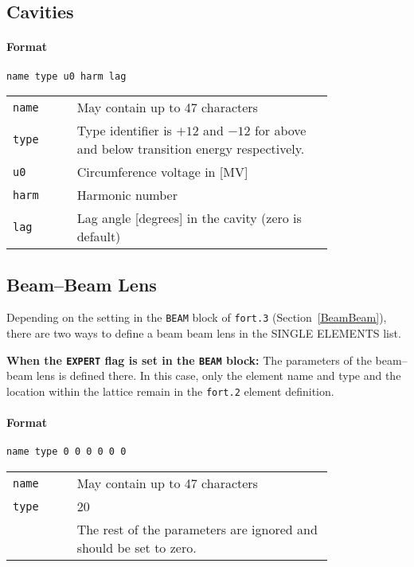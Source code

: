 \subsection{Cavities} \label{Cavities}

\paragraph{Format} \texttt{name type u0 harm lag}

\bigskip
\begin{tabular}{@{}lp{0.8\linewidth}}
    \texttt{name} & May contain up to 47 characters \\
    \texttt{type} & Type identifier is $+12$ and $-12$ for above and below transition energy respectively. \\
    \texttt{u0}   & Circumference voltage in [MV] \\
    \texttt{harm} & Harmonic number \\
    \texttt{lag}  & Lag angle [degrees] in the cavity (zero is default)
\end{tabular}

\subsection{Beam--Beam Lens} \label{BBS}

Depending on the setting in the \texttt{BEAM} block of \texttt{fort.3} (Section~\ref{BeamBeam}), there are two ways to define a beam beam lens in the SINGLE ELEMENTS list.

\bigskip
\noindent\textbf{When the \texttt{EXPERT} flag is set in the \texttt{BEAM} block:}
The parameters of the beam--beam lens is defined there.
In this case, only the element name and type and the location within the lattice remain in the \texttt{fort.2} element definition.

\paragraph{Format} \texttt{name type 0 0 0 0 0 0}

\bigskip
\begin{tabular}{@{}lp{0.8\linewidth}}
    \texttt{name} & May contain up to 47 characters \\
    \texttt{type} & 20 \\
    \texttt{}     & The rest of the parameters are ignored and should be set to zero.
\end{tabular}

